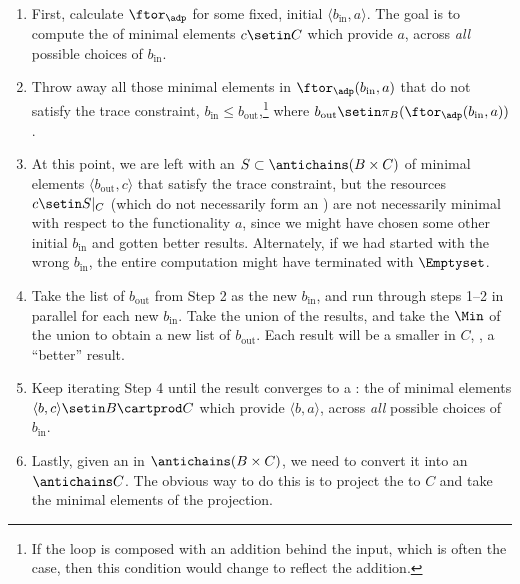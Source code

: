 \begin{enumerate}
    \item First, calculate $\ftor_\adp$ for some fixed, initial $\langle b_{\text{in}},a \rangle$.
          The goal is to compute the    of minimal elements $c \setin C$ which provide $a$, across \emph{all} possible choices of $b_{\text{in}}$.
    \item Throw away all those minimal elements in $\ftor_\adp(b_{\text{in}},a)$ that do not satisfy the trace constraint, $b_{\text{in}} \leq b_{\text{out}}$,\footnote{If the loop is composed with an addition behind the input, which is often the case, then this condition would change to reflect the addition.} where $b_{\text{out}} \setin \pi_B(\ftor_\adp(b_{\text{in}},a))$.
    \item At this point, we are left with an    $S \subset \antichains (B \times C)$ of minimal elements $\langle b_{\text{out}},c \rangle$ that satisfy the trace constraint, but the resources $c \setin S|_C$ (which do not necessarily form an   ) are not necessarily minimal with respect to the functionality $a$, since we might have chosen some other initial $b_{\text{in}}$ and gotten better results.
          Alternately, if we had started with the wrong $b_{\text{in}}$, the entire computation might have terminated with $\Emptyset$.
    \item Take the list of $b_{\text{out}}$ from Step 2 as the new $b_{\text{in}}$, and run through steps 1--2 in parallel for each new $b_{\text{in}}$.
          Take the union of the results, and take the $\Min$ of the union to obtain a new list of $b_{\text{out}}$.
          Each result will be a smaller    in $C$, \ie,  a ``better'' result.
    \item Keep iterating Step 4 until the result converges to a : the    of minimal elements $\langle b, c \rangle \setin B \cartprod C$ which provide $\langle b, a \rangle$, across \emph{all} possible choices of $b_{\text{in}}$.
    \item Lastly, given an    in $\antichains (B\times C)$, we need to convert it into an    $\antichains C$.
          The obvious way to do this is to project the    to $C$ and take the minimal elements of the projection.

\end{enumerate}
